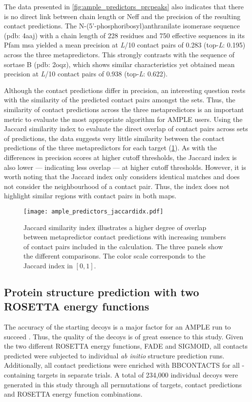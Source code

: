 The data presented in \cref{fig:ample_predictors_prcpeaks} also indicates that there is no direct link between chain length or Neff and the precision of the resulting contact predictions. The N-(5'-phosphoribosyl)anthranilate isomerase sequence (\gls{pdb}: 4aaj) with a chain length of 228 residues and 750 effective sequences in its Pfam \gls{msa} yielded a mean precision at \textit{L}/10 contact pairs of 0.283 (top-\textit{L}: 0.195) across the three metapredictors. This strongly contrasts with the sequence of sortase B (\gls{pdb}: 2oqz), which shows similar characteristics yet obtained  mean precision at \textit{L}/10 contact pairs of 0.938 (top-\textit{L}: 0.622).

Although the contact predictions differ in precision, an interesting question rests with the similarity of the predicted contact pairs amongst the sets. Thus, the similarity of contact predictions across the three metapredictors is an important metric to evaluate the most appropriate algorithm for AMPLE users. Using the Jaccard similarity index to evaluate the direct overlap of contact pairs across sets of predictions, the data suggests very little similarity between the contact predictions of the three metapredictors for each target (\cref{fig:ample_predictors_jaccardidx}). As with the differences in precision scores at higher cutoff thresholds, the Jaccard index is also lower --- indicating less overlap --- at higher cutoff thresholds. However, it is worth noting that the Jaccard index only considers identical matches and does not consider the neighbourhood of a contact pair. Thus, the index does not highlight similar regions with contact pairs in both maps.

\begin{figure}[H]
    \centering
    \texttt{[image: ample\_predictors\_jaccardidx.pdf]}
    \caption[Metapredictor contact pair similarity analysis]{Jaccard similarity index illustrates a higher degree of overlap between metapredictor contact predictions with increasing numbers of contact pairs included in the calculation. The three panels show the different comparisons. The color scale corresponds to the Jaccard index in $[0, 1]$.}
    \label{fig:ample_predictors_jaccardidx}
\end{figure}

\subsection{Protein structure prediction with two ROSETTA energy functions}
The accuracy of the starting decoys is a major factor for an AMPLE run to succeed \cite{Thomas2017-sh}. Thus, the quality of the decoys is of great essence to this study. Given the two different ROSETTA energy functions, FADE and SIGMOID, all contacts predicted were subjected to individual \textit{ab initio} structure prediction runs. Additionally, all contact predictions were enriched with BBCONTACTS for all \textbeta-containing targets in separate trials. A total of 234,000 individual decoys were generated in this study through all permutations of targets, contact predictions and ROSETTA energy function combinations.

